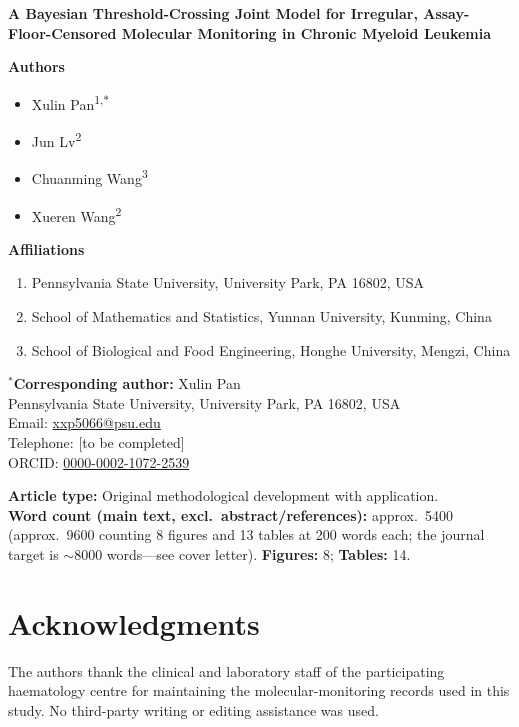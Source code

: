 \documentclass[11pt]{article}
\begin{document}
\thispagestyle{empty}

\begin{center}
{\LARGE\bfseries A Bayesian Threshold-Crossing Joint Model for Irregular,
Assay-Floor-Censored Molecular Monitoring in Chronic Myeloid Leukemia}
\end{center}

\bigskip
\noindent\textbf{Authors}

\begin{itemize}
\item Xulin Pan\textsuperscript{1,$\ast$}
\item Jun Lv\textsuperscript{2}
\item Chuanming Wang\textsuperscript{3}
\item Xueren Wang\textsuperscript{2}
\end{itemize}

\noindent\textbf{Affiliations}
\begin{enumerate}
\item Pennsylvania State University, University Park, PA 16802, USA
\item School of Mathematics and Statistics, Yunnan University, Kunming, China
\item School of Biological and Food Engineering, Honghe University, Mengzi, China
\end{enumerate}

\noindent$^{\ast}$\textbf{Corresponding author:} Xulin Pan\\
Pennsylvania State University, University Park, PA 16802, USA\\
Email: \href{mailto:xxp5066@psu.edu}{xxp5066@psu.edu}\\
Telephone: [to be completed]\\
ORCID: \href{https://orcid.org/0000-0002-1072-2539}{0000-0002-1072-2539}

\bigskip
\noindent\textbf{Article type:} Original methodological development with application.\\
\textbf{Word count (main text, excl.\ abstract/references):} approx.\ 5400
(approx.\ 9600 counting 8 figures and 13 tables at 200 words each; the journal
target is $\sim$8000 words---see cover letter). \textbf{Figures:} 8;
\textbf{Tables:} 14.

\bigskip
\section*{Acknowledgments}
The authors thank the clinical and laboratory staff of the participating
haematology centre for maintaining the molecular-monitoring records used in
this study. No third-party writing or editing assistance was used.
\end{document}
